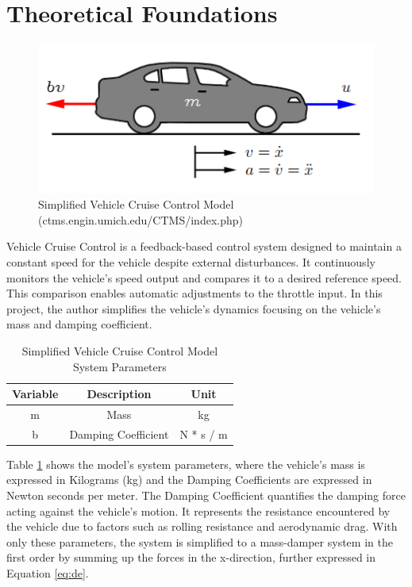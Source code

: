 \documentclass{article}
\begin{document}
\section{Theoretical Foundations}

\begin{figure}[H]
    \centering
    \includegraphics[width=0.7\linewidth]{img/cruise_control_schematic.png}
    \caption{Simplified Vehicle Cruise Control Model (ctms.engin.umich.edu/CTMS/index.php)}
    \label{fig:enter-label}
\end{figure}

Vehicle Cruise Control is a feedback-based control system designed to maintain a constant speed for the vehicle despite external disturbances. It continuously monitors the vehicle's speed output and compares it to a desired reference speed. This comparison enables automatic adjustments to the throttle input. In this project, the author simplifies the vehicle's dynamics focusing on the vehicle's mass and damping coefficient.

\begin{table}[H]
    \centering
    \begin{tabular}{ccc}
         Variable & Description & Unit \\
         \hline
         m & Mass & kg \\ 
         b & Damping Coefficient & N * s / m \\
    \end{tabular}
    \caption{Simplified Vehicle Cruise Control Model System Parameters}
    \label{tab:units}
\end{table}

Table \ref{tab:units} shows the model's system parameters, where the vehicle's mass is expressed in Kilograms (kg) and the Damping Coefficients are expressed in Newton seconds per meter. The Damping Coefficient quantifies the damping force acting against the vehicle's motion. It represents the resistance encountered by the vehicle due to factors such as rolling resistance and aerodynamic drag. With only these parameters, the system is simplified to a mass-damper system in the first order by summing up the forces in the x-direction, further expressed in Equation \ref{eq:de}.
\end{document}
